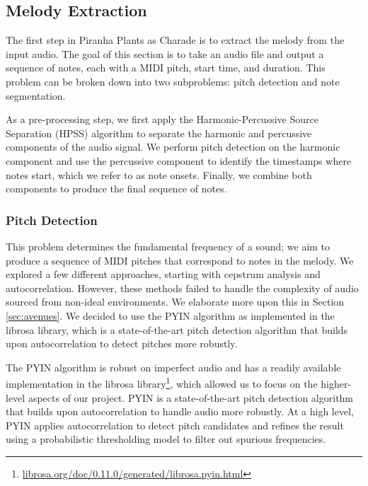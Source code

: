 \subsection{Melody Extraction}
\label{sec:melody_extraction}

The first step in Piranha Plants as Charade is to extract the melody from the input audio. The goal of this section is to take an audio file and output a sequence of notes, each with a MIDI pitch, start time, and duration. This problem can be broken down into two subproblems: pitch detection and note segmentation.

As a pre-processing step, we first apply the Harmonic-Percussive Source Separation (HPSS) algorithm \autocite{HPSS:2010,HPSS:2014} to separate the harmonic and percussive components of the audio signal. We perform pitch detection on the harmonic component and use the percussive component to identify the timestamps where notes start, which we refer to as note onsets. Finally, we combine both components to produce the final sequence of notes.

\subsubsection{Pitch Detection}

This problem determines the fundamental frequency of a sound; we aim to produce a sequence of MIDI pitches that correspond to notes in the melody. We explored a few different approaches, starting with cepstrum analysis and autocorrelation. However, these methods failed to handle the complexity of audio sourced from non-ideal environments. We elaborate more upon this in Section \ref{sec:avenues}. We decided to use the PYIN algorithm as implemented in the librosa library, which is a state-of-the-art pitch detection algorithm that builds upon autocorrelation to detect pitches more robustly.

The PYIN algorithm \autocite{PYIN:2014} is robust on imperfect audio and has a readily available implementation in the librosa library\footnote{\href{https://librosa.org/doc/0.11.0/generated/librosa.pyin.html}{librosa.org/doc/0.11.0/generated/librosa.pyin.html}}, which allowed us to focus on the higher-level aspects of our project. PYIN is a state-of-the-art pitch detection algorithm that builds upon autocorrelation to handle audio more robustly. At a high level, PYIN applies autocorrelation to detect pitch candidates and refines the result using a probabilistic thresholding model to filter out spurious frequencies.

